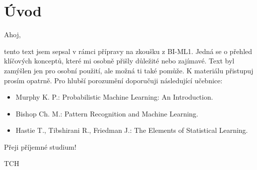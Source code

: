 \documentclass[../main.tex]{subfiles}
\begin{document}
\section{Úvod}

Ahoj,

tento text jsem sepsal v rámci přípravy na zkoušku z BI-ML1. Jedná se o přehled klíčových konceptů, které mi osobně přišly důležité nebo zajímavé. Text byl zamýšlen jen pro osobní použití, ale možná ti také pomůže. K materiálu přistupuj prosím opatrně. Pro hlubší porozumění doporučuji následující učebnice:
\begin{itemize}
    \item Murphy K. P.: Probabilistic Machine Learning: An Introduction.
    \item Bishop Ch. M.: Pattern Recognition and Machine Learning.
    \item Hastie T., Tibshirani R., Friedman J.: The Elements of Statistical Learning.
\end{itemize}

Přeji příjemné studium!

\begin{flushright}
    TCH
\end{flushright}
\end{document}
